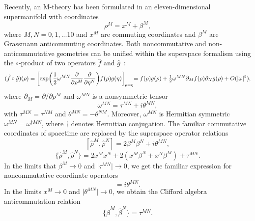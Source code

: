 \documentclass[a4paper,12pt]{article}
\begin{document}
Recently, an M-theory has been formulated in an eleven-dimensional
supermanifold with coordinates~\cite{Moffat}
\begin{equation}
\rho^M=x^M+\beta^M,
\end{equation}
where $M,N=0,1,...10$ and $x^M$ are commuting coordinates
and $\beta^M$ are Grassmann anticommuting coordinates.
Both noncommutative and non-anticommutative geometries can be unified
within the superspace formalism using the $\circ$-product of two
operators ${\hat f}$ and ${\hat g}$~\cite{Moffat2,Moffat3,Moffat4}:
\begin{equation}
\label{fgproduct}
({\hat f}\circ{\hat g})(\rho)
=\biggl[\exp\biggl(\frac{1}{2}\omega^{MN}
\frac{\partial}{\partial\rho^M}\frac{\partial}{\partial\eta^N}\biggr)
f(\rho)g(\eta)\biggr]_{\rho=\eta} $$ $$
=f(\rho)g(\rho)+\frac{1}{2}\omega^{MN}\partial_M
f(\rho)\partial_Ng(\rho)+O(\vert\omega\vert^2),
\end{equation}
where $\partial_M=\partial/\partial\rho^M$ and $\omega^{MN}$ is a
nonsymmetric tensor
\begin{equation}
\omega^{MN}=\tau^{MN}+i\theta^{MN},
\end{equation} with
$\tau^{MN}=\tau^{NM}$ and $\theta^{MN}=-\theta^{NM}$.
Moreover, $\omega^{MN}$ is Hermitian symmetric
$\omega^{MN}=\omega^{\dagger MN}$, where $\dagger$ denotes Hermitian
conjugation. The familiar commutative coordinates of spacetime are replaced
by the superspace operator relations
\begin{equation}
\label{commutator}
[{\hat\rho}^M,{\hat\rho}^N]=2\beta^M\beta^N+i\theta^{MN},
\end{equation}
\begin{equation}
\label{anticommutator}
\{{\hat\rho}^M,{\hat\rho}^N\}=2x^Mx^N+2(x^M\beta^N+x^N\beta^M)+\tau^{MN}.
\end{equation}
In the limits that $\beta^M\rightarrow 0$ and
$\vert\tau^{MN}\vert\rightarrow 0$, we get the familiar expression for
noncommutative coordinate operators
\begin{equation}
[{\hat x}^M,{\hat x}^N]=i\theta^{MN}.
\end{equation}
In the limits $x^M\rightarrow 0$ and $\vert\theta^{MN}\vert\rightarrow 0$,
we obtain the Clifford algebra anticommutation relation
\begin{equation}
\{{\hat\beta}^M,{\hat\beta}^N\}=\tau^{MN}.
\end{equation}
\end{document}
